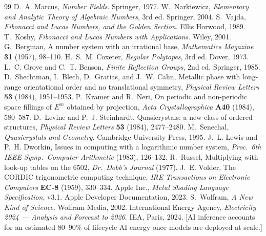 \documentclass[12pt]{article}
\theoremstyle{definition}
\theoremstyle{remark}
\begin{document}
\begin{thebibliography}{99}
  D.~A. Marcus, \emph{Number Fields}. Springer, 1977.
  W.~Narkiewicz, \emph{Elementary and Analytic Theory of Algebraic Numbers},
  3rd ed. Springer, 2004.
  S.~Vajda, \emph{Fibonacci and Lucas Numbers, and the Golden Section}.
  Ellis Horwood, 1989.
  T.~Koshy, \emph{Fibonacci and Lucas Numbers with Applications}.
  Wiley, 2001.
  G.~Bergman, A number system with an irrational base,
  \emph{Mathematics Magazine} \textbf{31} (1957), 98--110.
  H.~S.~M. Coxeter, \emph{Regular Polytopes}, 3rd ed. Dover, 1973.
  L.~C. Grove and C.~T. Benson, \emph{Finite Reflection Groups},
  2nd ed. Springer, 1985.
  D.~Shechtman, I.~Blech, D.~Gratias, and J.~W. Cahn,
  Metallic phase with long-range orientational order and no
  translational symmetry,
  \emph{Physical Review Letters} \textbf{53} (1984), 1951--1953.
  P.~Kramer and R.~Neri,
  On periodic and non-periodic space fillings of $E^m$ obtained
  by projection,
  \emph{Acta Crystallographica} \textbf{A40} (1984), 580--587.
  D.~Levine and P.~J. Steinhardt,
  Quasicrystals: a new class of ordered structures,
  \emph{Physical Review Letters} \textbf{53} (1984), 2477--2480.
  M.~Senechal, \emph{Quasicrystals and Geometry}.
  Cambridge University Press, 1995.
  J.~L. Lewis and P.~H. Dworkin,
  Issues in computing with a logarithmic number system,
  \emph{Proc.\ 6th IEEE Symp.\ Computer Arithmetic} (1983), 126--132.
  R.~Russel, Multiplying with look-up tables on the 6502,
  \emph{Dr.\ Dobb's Journal} (1977).
  J.~E. Volder, The CORDIC trigonometric computing technique,
  \emph{IRE Transactions on Electronic Computers} \textbf{EC-8}
  (1959), 330--334.
  Apple Inc., \emph{Metal Shading Language Specification}, v3.1.
  Apple Developer Documentation, 2023.
  S.~Wolfram, \emph{A New Kind of Science}. Wolfram Media, 2002.
  International Energy Agency,
  \emph{Electricity 2024 --- Analysis and Forecast to 2026}.
  IEA, Paris, 2024.
  [AI inference accounts for an estimated 80--90\% of lifecycle AI
  energy once models are deployed at scale.]
\end{thebibliography}
\end{document}
